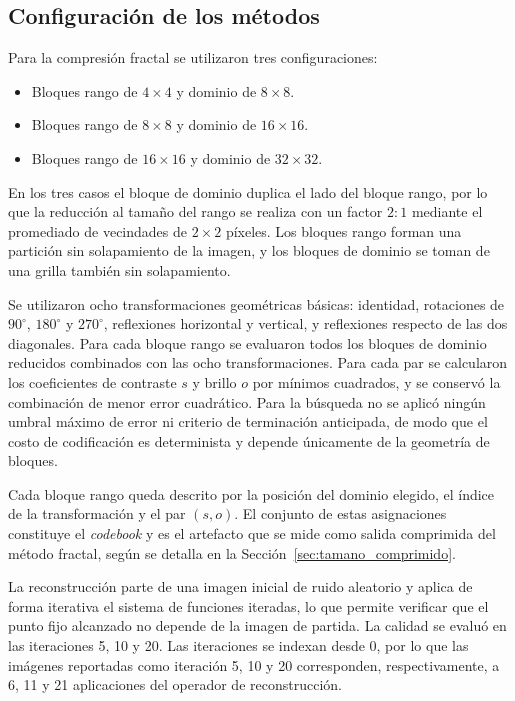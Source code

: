 \subsection{Configuración de los métodos}

Para la compresión fractal se utilizaron tres configuraciones:

\begin{itemize}
    \item Bloques rango de $4\times4$ y dominio de $8\times8$.
    \item Bloques rango de $8\times8$ y dominio de $16\times16$.
    \item Bloques rango de $16\times16$ y dominio de $32\times32$.
\end{itemize}

En los tres casos el bloque de dominio duplica el lado del bloque rango, por lo que la reducción al tamaño del rango se realiza con un factor $2{:}1$ mediante el promediado de vecindades de $2\times2$ píxeles. Los bloques rango forman una partición sin solapamiento de la imagen, y los bloques de dominio se toman de una grilla también sin solapamiento.

Se utilizaron ocho transformaciones geométricas básicas: identidad, rotaciones de $90^\circ$, $180^\circ$ y $270^\circ$, reflexiones horizontal y vertical, y reflexiones respecto de las dos diagonales. Para cada bloque rango se evaluaron todos los bloques de dominio reducidos combinados con las ocho transformaciones. Para cada par se calcularon los coeficientes de contraste $s$ y brillo $o$ por mínimos cuadrados, y se conservó la combinación de menor error cuadrático. Para la búsqueda no se aplicó ningún umbral máximo de error ni criterio de terminación anticipada, de modo que el costo de codificación es determinista y depende únicamente de la geometría de bloques.

Cada bloque rango queda descrito por la posición del dominio elegido, el índice de la transformación y el par $(s, o)$. El conjunto de estas asignaciones constituye el \emph{codebook} y es el artefacto que se mide como salida comprimida del método fractal, según se detalla en la Sección~\ref{sec:tamano_comprimido}.

La reconstrucción parte de una imagen inicial de ruido aleatorio y aplica de forma iterativa el sistema de funciones iteradas, lo que permite verificar que el punto fijo alcanzado no depende de la imagen de partida. La calidad se evaluó en las iteraciones 5, 10 y 20. Las iteraciones se indexan desde 0, por lo que las imágenes reportadas como iteración 5, 10 y 20 corresponden, respectivamente, a 6, 11 y 21 aplicaciones del operador de reconstrucción.

